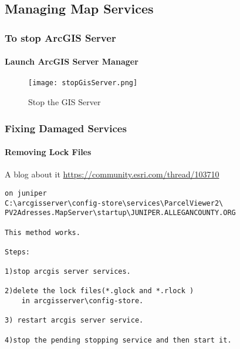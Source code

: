 \documentclass[class=article , crop=false, titlepage, twoside, multi={itemize, figure, verbatim}, float=false]{standalone}
\title{}  %
\begin{document}

\ifstandalone
\maketitle %
\tableofcontents %
\clearpage
\fi

\subsection{Managing Map Services}
\medskip
\subsubsection[Stopping the Server]{To stop ArcGIS Server}

\paragraph*{Launch ArcGIS Server Manager}
\begin{figure}[h!]
\centering
    \texttt{[image: stopGisServer.png]}
\caption{Stop the GIS Server}
\end{figure}

\subsubsection[Fixing Damaged Services]{\Large Fixing Damaged Services}

\paragraph[Remove Lock Files]{Removing Lock Files \texorpdfstring{\\}{}}
A blog about it 
\href{https://community.esri.com/thread/103710}{https://community.esri.com/thread/103710}

\begin{verbatim}
on juniper
C:\arcgisserver\config-store\services\ParcelViewer2\
PV2Adresses.MapServer\startup\JUNIPER.ALLEGANCOUNTY.ORG

This method works. 

Steps:

1)stop arcgis server services.

2)delete the lock files(*.glock and *.rlock ) 
    in arcgisserver\config-store.

3) restart arcgis server service.

4)stop the pending stopping service and then start it.
\end{verbatim}
\end{document}
